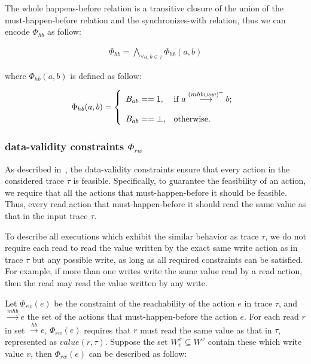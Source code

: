 \documentclass[preprint, numbers, 10pt]{sigplanconf}
\begin{document}
The whole happens-before relation is a transitive closure of the union of the must-happen-before relation
and the synchronizes-with relation, thus we can encode $\Phi_{hb}$ as follow: 

\begin{equation}
\begin{aligned}
\Phi_{hb} = \bigwedge_{\forall a,b\in \tau} \Phi_{hb}(a,b)
\end{aligned}
\end{equation}

where $\Phi_{hb}(a,b)$ is defined as follow: 

\[ \Phi_{hb}(a,b) = \left\{
  \begin{array}{l l}
    B_{ab}==1,           &  {\text{if $a \stackrel{(mhb\cup sw)^+}{\longrightarrow} b$; }}\\\\
    B_{ab}==\bot,  &  \text{otherwise}.
  \end{array} \right.\]

\subsubsection{data-validity constraints $\Phi_{rw}$}

As described in~\cite{Huang:2015}, the data-validity constraints
ensure that every action in the considered trace $\tau$ is feasible. 
Specifically, to guarantee the feasibility of an action, we require that
all the actions that must-happen-before it should be feasible. Thus,
every read action that must-happen-before it should read the same value
as that in the input trace $\tau$.  

To describe all executions which exhibit the similar behavior as trace $\tau$, 
we do not require each read to read the value written by the exact same write action
as in trace $\tau$ but any possible write, as long as all required constraints
can be satisfied. For example, if more than one writes write the same value read
by a read action, then the read may read the value written by any write.  

Let $\Phi_{rw}(e)$ be the constraint of the reachability of the action $e$ in trace $\tau$,
and  $\stackrel{mhb}{\longrightarrow} e$ the set of the actions that must-happen-before
the action $e$. For each read $r$ in set  $\stackrel{hb}{\longrightarrow} e$, $\Phi_{rw}(e)$
requires that $r$ must read the same value as that in $\tau$, represented as $value(r, \tau)$. 
Suppose %
the set $W_v^x\subseteq W^x$ contain these which write value $v$, then
$\Phi_{rw}(e)$ can be described as follow: 
\end{document}
